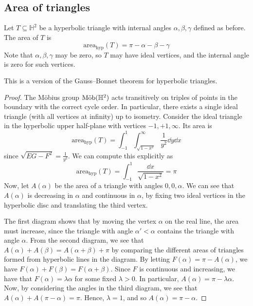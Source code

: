 \subsection{Area of triangles}
\begin{theorem}
	Let \( T \subseteq \mathbb H^2 \) be a hyperbolic triangle with internal angles \( \alpha, \beta, \gamma \) defined as before.
	The area of \( T \) is
	\[
		\mathrm{area}_{\text{hyp}}(T) = \pi - \alpha - \beta - \gamma
	\]
	Note that \( \alpha, \beta, \gamma \) may be zero, so \( T \) may have ideal vertices, and the internal angle is zero for such vertices.
\end{theorem}
This is a version of the Gauss--Bonnet theorem for hyperbolic triangles.
\begin{proof}
	The M\"obius group \( \text{M\"ob}(\mathbb H^2) \) acts transitively on triples of points in the boundary with the correct cycle order.
	In particular, there exists a single ideal triangle (with all vertices at infinity) up to isometry.
	Consider the ideal triangle in the hyperbolic upper half-plane with vertices \( -1, +1, \infty \).
	Its area is
	\[
		\mathrm{area}_{\text{hyp}}(T) = \int_{-1}^1 \int_{\sqrt{1-x^2}}^\infty \frac{1}{y^2} \dd{y} \dd{x}
	\]
	since \( \sqrt{EG - F^2} = \frac{1}{y^2} \).
	We can compute this explicitly as
	\[
		\mathrm{area}_{\text{hyp}}(T) = \int_{-1}^1 \frac{\dd{x}}{\sqrt{1-x^2}} = \pi
	\]
	Now, let \( A(\alpha) \) be the area of a triangle with angles \( 0, 0, \alpha \).
	We can see that \( A(\alpha) \) is decreasing in \( \alpha \) and continuous in \( \alpha \), by fixing two ideal vertices in the hyperbolic disc and translating the third vertex.
	\begin{center}
		\quad
		\quad
	\end{center}
	The first diagram shows that by moving the vertex \( \alpha \) on the real line, the area must increase, since the triangle with angle \( \alpha' < \alpha \) contains the triangle with angle \( \alpha \).
	From the second diagram, we see that \( A(\alpha) + A(\beta) = A(\alpha + \beta) + \pi \) by comparing the different areas of triangles formed from hyperbolic lines in the diagram.
	By letting \( F(\alpha) = \pi - A(\alpha) \), we have \( F(\alpha) + F(\beta) = F(\alpha + \beta) \).
	Since \( F \) is continuous and increasing, we have that \( F(\alpha) = \lambda \alpha \) for some fixed \( \lambda > 0 \).
	In particular, \( A(\alpha) = \pi - \lambda \alpha \).
	Now, by considering the angles in the third diagram, we see that \( A(\alpha) + A(\pi - \alpha) = \pi \).
	Hence, \( \lambda = 1 \), and so \( A(\alpha) = \pi - \alpha \).


\end{proof}
